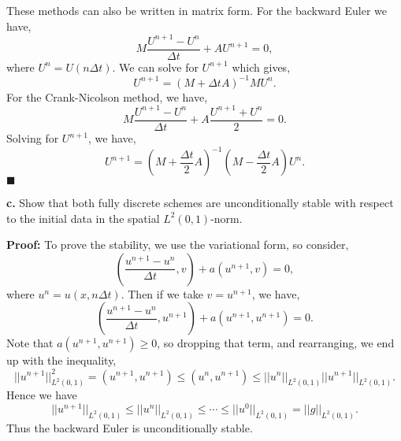 \documentclass[11pt]{article}
\begin{document}
These methods can also be written in matrix form.
For the backward Euler we have,
\begin{equation}
    M \frac{U^{n+1} - U^n}{\Delta t} + A U^{n+1} = 0,
\end{equation}
where $U^n = U(n\Delta t)$.
We can solve for $U^{n+1}$ which gives,
\begin{equation*}
    U^{n+1} =  (M+\Delta t A)^{-1} M U^n.
\end{equation*}
For the Crank-Nicolson method, we have,
\begin{equation*}
    M\frac{U^{n+1} - U^n}{\Delta t} + A \frac{U^{n+1} + U^n}{2} = 0.
\end{equation*}
Solving for $U^{n+1}$, we have,
\begin{equation*}
    U^{n+1} = (M + \frac{\Delta t}{2} A)^{-1} (M - \frac{\Delta t}{2} A) U^n.
\end{equation*}
$\blacksquare$


\vskip 2cm


\textbf{c.} Show that both fully discrete schemes are unconditionally stable with respect to the initial data in the spatial $L^2(0,1)$-norm.

\vskip 1cm


\textbf{Proof:} To prove the stability, we use the variational form, so consider,
\begin{equation*}
    (\frac{u^{n+1} - u^n}{\Delta t}, v) + a(u^{n+1},v) = 0,
\end{equation*}
where $u^n = u(x, n\Delta t)$.
Then if we take $v = u^{n+1}$, we have,
\begin{equation*}
    (\frac{u^{n+1} - u^n}{\Delta t}, u^{n+1}) + a(u^{n+1}, u^{n+1}) = 0.
\end{equation*}
Note that $a(u^{n+1}, u^{n+1}) \geq 0$, so dropping that term, and rearranging, we end up with the inequality,
\begin{equation*}
    ||u^{n+1}||^2_{L^2(0,1)} = (u^{n+1}, u^{n+1}) \leq (u^n, u^{n+1}) \leq ||u^n||_{L^2(0,1)} ||u^{n+1}||_{L^2(0,1)}.
\end{equation*}
Hence we have 
\begin{equation*}
    ||u^{n+1}||_{L^2(0,1)} \leq ||u^n||_{L^2(0,1)} \leq \cdots \leq ||u^0||_{L^2(0,1)} = ||g||_{L^2(0,1)}.
\end{equation*}
Thus the backward Euler is unconditionally stable.
\end{document}
